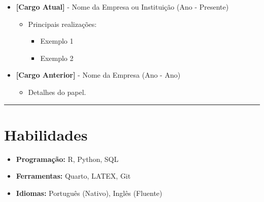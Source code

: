 \documentclass[
  12pt,
  a4paper,
]{article}
\providecommand{\tightlist}{%
  \setlength{\itemsep}{0pt}\setlength{\parskip}{0pt}}\usepackage{longtable,booktabs,array}
\begin{document}
\begin{itemize}
\tightlist
\item
  \textbf{{[}Cargo Atual{]}} - Nome da Empresa ou Instituição (Ano -
  Presente)

  \begin{itemize}
  \tightlist
  \item
    Principais realizações:

    \begin{itemize}
    \tightlist
    \item
      Exemplo 1
    \item
      Exemplo 2
    \end{itemize}
  \end{itemize}
\item
  \textbf{{[}Cargo Anterior{]}} - Nome da Empresa (Ano - Ano)

  \begin{itemize}
  \tightlist
  \item
    Detalhes do papel.
  \end{itemize}
\end{itemize}

\begin{center}\rule{0.5\linewidth}{0.5pt}\end{center}

\section{Habilidades}\label{habilidades}

\begin{itemize}
\tightlist
\item
  \textbf{Programação:} R, Python, SQL
\item
  \textbf{Ferramentas:} Quarto, LATEX, Git
\item
  \textbf{Idiomas:} Português (Nativo), Inglês (Fluente)
\end{itemize}
\end{document}
